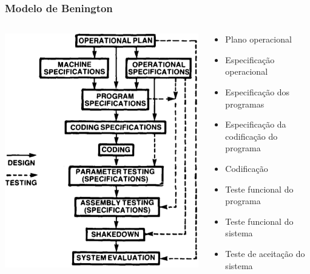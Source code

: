 \begin{frame}[hasnext=true, hasprev=true]
	\frametitle{Modelo de Benington}

	\begin{columns}
		\begin{block:fact}{}
			\centering
			\includegraphics[width=\textwidth]{software-engineering/project-management/process/sdlc/benington/Benington software life-cycle model.png}
		\end{block:fact}	

		\column{.5\textwidth}
		\begin{block:fact}{}
			\small
			\begin{itemize}
			 \item Plano operacional
			 \item Especificação operacional
			 \item Especificação dos programas
			 \item Especificação da codificação do programa
			 \item Codificação
			 \item Teste funcional do programa
			 \item Teste funcional do sistema
			 \item Teste de aceitação do sistema
			\end{itemize}
		\end{block:fact}
	\end{columns}


\end{frame}
